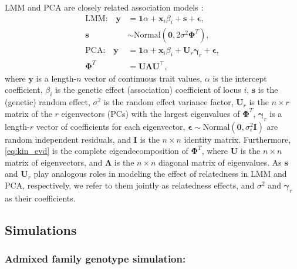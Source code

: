 \documentclass[9pt,twocolumn,twoside]{gsajnl}
\newcommand{\kinMat}[1][T]{\mathbf{\Phi}^{#1}}
\begin{document}
LMM and PCA are closely related association models \citep{astle_population_2009, hoffman_correcting_2013, yao_limitations_2022}:
\begin{align}
  \label{eq:lmm_gwas}
  \text{LMM:}\quad
  \mathbf{y}
  &=
    \mathbf{1} \alpha + \mathbf{x}_i \beta_i + \mathbf{s} + \boldsymbol{\epsilon}
    , \\
  \label{eq:lmm_rand_eff}
  \mathbf{s}
  &\sim
    \text{Normal} \left( \mathbf{0}, 2 \sigma^2 \kinMat \right), \\
  \label{eq:pca_gwas}
  \text{PCA:}\quad
  \mathbf{y}
  &=
    \mathbf{1} \alpha + \mathbf{x}_i \beta_i + \mathbf{U}_r \boldsymbol{\gamma}_r + \boldsymbol{\epsilon}
    , \\
  \label{eq:kin_evd}
  \kinMat
  &=
    \mathbf{U} \mathbf{\Lambda} \mathbf{U}^\intercal
    ,
\end{align}
where
$\mathbf{y}$ is a length-$n$ vector of continuous trait values,
$\alpha$ is the intercept coefficient,
$\beta_i$ is the genetic effect (association) coefficient of locus $i$,
$\mathbf{s}$ is the (genetic) random effect,
$\sigma^2$ is the random effect variance factor,
$\mathbf{U}_r$ is the $n \times r$ matrix of the $r$ eigenvectors (PCs) with the largest eigenvalues of $\kinMat$,
$\boldsymbol{\gamma}_r$ is a length-$r$ vector of coefficients for each eigenvector,
$\boldsymbol{\epsilon} \sim \text{Normal}(\mathbf{0}, \sigma^2_\epsilon \mathbf{I})$ are random independent residuals,
and $\mathbf{I}$ is the $n \times n$ identity matrix.
Furthermore, \cref{eq:kin_evd} is the complete eigendecomposition of $\kinMat$,
where $\mathbf{U}$ is the $n \times n$ matrix of eigenvectors, and
$\mathbf{\Lambda}$ is the $n \times n$ diagonal matrix of eigenvalues.
As $\mathbf{s}$ and $\mathbf{U}_r$ play analogous roles in modeling the effect of relatedness in LMM and PCA, respectively, we refer to them jointly as relatedness effects, and $\sigma^2$ and $\boldsymbol{\gamma}_r$ as their coefficients.

\subsection{Simulations}

\subsubsection{Admixed family genotype simulation:}
\end{document}
